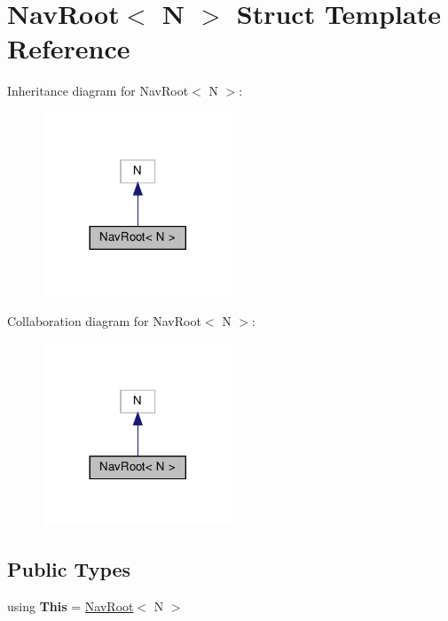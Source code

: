 \hypertarget{structNavRoot}{}\section{Nav\+Root$<$ N $>$ Struct Template Reference}
\label{structNavRoot}


Inheritance diagram for Nav\+Root$<$ N $>$\+:\nopagebreak
\begin{figure}[H]
\begin{center}
\leavevmode
\includegraphics[width=161pt]{structNavRoot__inherit__graph}
\end{center}
\end{figure}


Collaboration diagram for Nav\+Root$<$ N $>$\+:\nopagebreak
\begin{figure}[H]
\begin{center}
\leavevmode
\includegraphics[width=161pt]{structNavRoot__coll__graph}
\end{center}
\end{figure}
\subsection*{Public Types}
\begin{DoxyCompactItemize}
\item 
\mbox{\label{structNavRoot_a7a80cda58fc1952053328b4c52451f50}} 
using {\bfseries This} = \hyperlink{structNavRoot}{Nav\+Root}$<$ N $>$
\end{DoxyCompactItemize}
